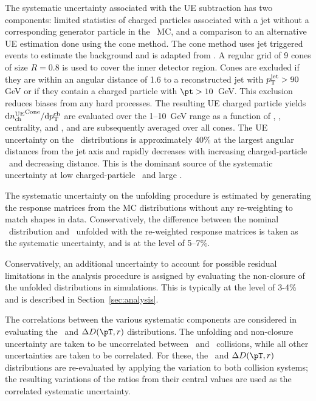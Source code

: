 The systematic uncertainty associated with the UE subtraction has two components: limited statistics of charged particles associated with a jet without a corresponding generator particle in the \pbpb\ MC, and a comparison to an alternative UE estimation done using the cone method. The cone method uses jet triggered events to estimate the background and is adapted from \cite{Aaboud:2018hpb, Aaboud:2017bzv}. A regular grid of 9 cones of size $R = 0.8$ is used to cover the inner detector region. Cones are excluded if they are within an angular distance of 1.6 to a reconstructed jet with $\mbox{$p_{\mathrm{T}}^{\mathrm{jet}}$} > 90$ GeV or if they contain a charged particle with \mbox{$\pt > 10$ GeV}. This exclusion reduces biases from any hard processes. The resulting UE charged particle yields $\mathrm{d} \mbox{$n_{\mathrm{ch}}^{\mathrm{UE}}$}^{\mathrm{Cone}}/ \mathrm{d} \mbox{$p_{{\mathrm{T}}}^{\mathrm{ch}}$}$ are evaluated over the \mbox{1--10 GeV} range as a function of \pttrk, \ptjet, centrality, and \rvar, and are subsequently averaged over all cones. The UE uncertainty on the \Dptr\ distributions is approximately 40\% at the largest angular distances from the jet axis and rapidly decreases with increasing charged-particle \pT\ and decreasing distance. This is the dominant source of the systematic uncertainty at low charged-particle \pt\ and large \rvar.


The systematic uncertainty on the unfolding procedure is estimated by generating the response matrices from the MC distributions without any re-weighting to match shapes in data. Conservatively, the difference between the nominal \Dptr\ distribution and \Dptr\ unfolded with the re-weighted response matrices is taken as the systematic uncertainty, and is at the level of 5--7\%.

Conservatively, an additional uncertainty to account for possible residual limitations in the analysis procedure is assigned by evaluating the non-closure of the unfolded distributions in simulations. This is typically at the level of 3-4\% and is described in Section~\ref{sec:analysis}.

The correlations between the various systematic components are considered in evaluating the \RDptr\ and $\Delta\Dptr$ distributions. The unfolding and non-closure uncertainty are taken to be uncorrelated between \pp\ and \pbpb\ collisions, while all other uncertainties are taken to be correlated. For these, the \RDptr\ and $\Delta\Dptr$ distributions are re-evaluated by applying the variation to both collision systems; the resulting variations of the ratios from their central values are used as the correlated systematic uncertainty. 

